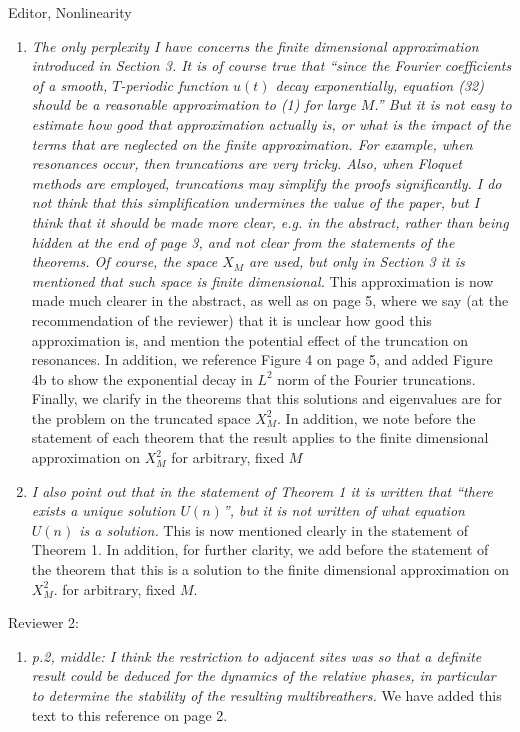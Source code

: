 \documentclass[11pt]{letter}
\begin{document}
\begin{letter}{Editor, Nonlinearity}
\begin{enumerate}
    \item \emph{The only perplexity I have concerns the finite dimensional approximation introduced in Section 3. It is of course true that ``since the Fourier coefficients of a smooth, $T$-periodic function $u(t)$ decay exponentially, equation (32) should be a reasonable approximation to (1) for large $M$.'' But it is not easy to estimate how good that approximation actually is, or what is the impact of the terms that are neglected on the finite approximation. For example, when resonances occur, then truncations are very tricky. Also, when Floquet methods are employed, truncations may simplify the proofs significantly. I do not think that this simplification undermines the value of the paper, but I think that it should be made more clear, e.g. in the abstract, rather than being hidden at the end of page 3, and not clear from the statements of the theorems. Of course, the space $X_M$ are used, but only in Section 3 it is mentioned that such space is finite dimensional.}
    This approximation is now made much clearer in the abstract, as well as on page 5, where we say (at the recommendation of the reviewer) that it is unclear how good this approximation is, and mention the potential effect of the truncation on resonances. In addition, we reference Figure 4 on page 5, and added Figure 4b to show the exponential decay in $L^2$ norm of the Fourier truncations. Finally, we clarify in the theorems that this solutions and eigenvalues are for the problem on the truncated space $X_M^2$. In addition, we note before the statement of each theorem that the result applies to the finite dimensional approximation on $X_{M}^2$ for arbitrary, fixed $M$
    \vspace{4mm}

    \item \emph{I also point out that in the statement of Theorem 1 it is written that ``there exists a unique solution $U(n)$'', but it is not written of what equation $U(n)$ is a solution.} 
    This is now mentioned clearly in the statement of Theorem 1. In addition, for further clarity, we add before the statement of the theorem that this is a solution to the finite dimensional approximation on $X_{M}^2$. for arbitrary, fixed $M$.
\end{enumerate}

Reviewer 2:
\begin{enumerate}
    \item \emph{p.2, middle: I think the restriction to adjacent sites was so that a definite result could be deduced for the dynamics of the relative phases, in particular to determine the stability of the resulting multibreathers.} We have added this text to this reference on page 2.
    \vspace{4mm}


\end{enumerate}
\end{letter}
\end{document}
